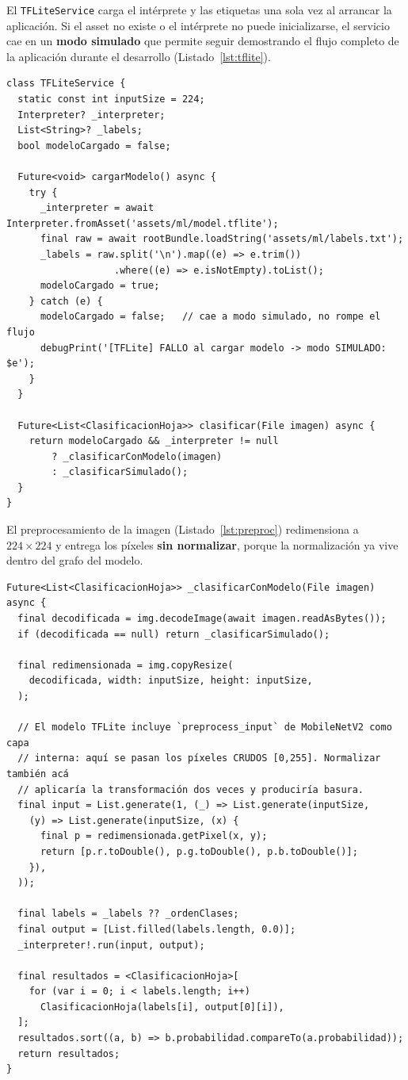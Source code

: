 \documentclass[12pt,a4paper]{article}
\begin{document}
El \texttt{TFLiteService} carga el intérprete y las etiquetas una sola vez al
arrancar la aplicación. Si el asset no existe o el intérprete no puede
inicializarse, el servicio cae en un \textbf{modo simulado} que permite seguir
demostrando el flujo completo de la aplicación durante el desarrollo
(Listado~\ref{lst:tflite}).

\begin{lstlisting}[caption={Carga tolerante a fallo del modelo TFLite}, label={lst:tflite}]
class TFLiteService {
  static const int inputSize = 224;
  Interpreter? _interpreter;
  List<String>? _labels;
  bool modeloCargado = false;

  Future<void> cargarModelo() async {
    try {
      _interpreter = await Interpreter.fromAsset('assets/ml/model.tflite');
      final raw = await rootBundle.loadString('assets/ml/labels.txt');
      _labels = raw.split('\n').map((e) => e.trim())
                   .where((e) => e.isNotEmpty).toList();
      modeloCargado = true;
    } catch (e) {
      modeloCargado = false;   // cae a modo simulado, no rompe el flujo
      debugPrint('[TFLite] FALLO al cargar modelo -> modo SIMULADO: $e');
    }
  }

  Future<List<ClasificacionHoja>> clasificar(File imagen) async {
    return modeloCargado && _interpreter != null
        ? _clasificarConModelo(imagen)
        : _clasificarSimulado();
  }
}
\end{lstlisting}

El preprocesamiento de la imagen (Listado~\ref{lst:preproc}) redimensiona a
$224\times224$ y entrega los píxeles \textbf{sin normalizar}, porque la
normalización ya vive dentro del grafo del modelo.

\begin{lstlisting}[caption={Preprocesamiento e inferencia}, label={lst:preproc}]
Future<List<ClasificacionHoja>> _clasificarConModelo(File imagen) async {
  final decodificada = img.decodeImage(await imagen.readAsBytes());
  if (decodificada == null) return _clasificarSimulado();

  final redimensionada = img.copyResize(
    decodificada, width: inputSize, height: inputSize,
  );

  // El modelo TFLite incluye `preprocess_input` de MobileNetV2 como capa
  // interna: aquí se pasan los píxeles CRUDOS [0,255]. Normalizar también acá
  // aplicaría la transformación dos veces y produciría basura.
  final input = List.generate(1, (_) => List.generate(inputSize,
    (y) => List.generate(inputSize, (x) {
      final p = redimensionada.getPixel(x, y);
      return [p.r.toDouble(), p.g.toDouble(), p.b.toDouble()];
    }),
  ));

  final labels = _labels ?? _ordenClases;
  final output = [List.filled(labels.length, 0.0)];
  _interpreter!.run(input, output);

  final resultados = <ClasificacionHoja>[
    for (var i = 0; i < labels.length; i++)
      ClasificacionHoja(labels[i], output[0][i]),
  ];
  resultados.sort((a, b) => b.probabilidad.compareTo(a.probabilidad));
  return resultados;
}
\end{lstlisting}
\end{document}
